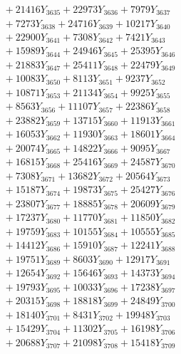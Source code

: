 \documentclass[a4paper,10pt]{article}
\begin{document}
{\begin{align}
&\;  + 21416 Y_{3635} + 22973 Y_{3636} + 7979 Y_{3637} \\[0.3ex]
&\;  + 7273 Y_{3638} + 24716 Y_{3639} + 10217 Y_{3640} \\[0.3ex]
&\;  + 22900 Y_{3641} + 7308 Y_{3642} + 7421 Y_{3643} \\[0.3ex]
&\;  + 15989 Y_{3644} + 24946 Y_{3645} + 25395 Y_{3646} \\[0.3ex]
&\;  + 21883 Y_{3647} + 25411 Y_{3648} + 22479 Y_{3649} \\[0.3ex]
&\;  + 10083 Y_{3650} + 8113 Y_{3651} + 9237 Y_{3652} \\[0.3ex]
&\;  + 10871 Y_{3653} + 21134 Y_{3654} + 9925 Y_{3655} \\[0.3ex]
&\;  + 8563 Y_{3656} + 11107 Y_{3657} + 22386 Y_{3658} \\[0.5ex]\allowbreak
&\;  + 23882 Y_{3659} + 13715 Y_{3660} + 11913 Y_{3661} \\[0.3ex]
&\;  + 16053 Y_{3662} + 11930 Y_{3663} + 18601 Y_{3664} \\[0.3ex]
&\;  + 20074 Y_{3665} + 14822 Y_{3666} + 9095 Y_{3667} \\[0.3ex]
&\;  + 16815 Y_{3668} + 25416 Y_{3669} + 24587 Y_{3670} \\[0.3ex]
&\;  + 7308 Y_{3671} + 13682 Y_{3672} + 20564 Y_{3673} \\[0.3ex]
&\;  + 15187 Y_{3674} + 19873 Y_{3675} + 25427 Y_{3676} \\[0.3ex]
&\;  + 23807 Y_{3677} + 18885 Y_{3678} + 20609 Y_{3679} \\[0.3ex]
&\;  + 17237 Y_{3680} + 11770 Y_{3681} + 11850 Y_{3682} \\[0.3ex]
&\;  + 19759 Y_{3683} + 10155 Y_{3684} + 10555 Y_{3685} \\[0.3ex]
&\;  + 14412 Y_{3686} + 15910 Y_{3687} + 12241 Y_{3688} \\[0.5ex]\allowbreak
&\;  + 19751 Y_{3689} + 8603 Y_{3690} + 12917 Y_{3691} \\[0.3ex]
&\;  + 12654 Y_{3692} + 15646 Y_{3693} + 14373 Y_{3694} \\[0.3ex]
&\;  + 19793 Y_{3695} + 10033 Y_{3696} + 17238 Y_{3697} \\[0.3ex]
&\;  + 20315 Y_{3698} + 18818 Y_{3699} + 24849 Y_{3700} \\[0.3ex]
&\;  + 18140 Y_{3701} + 8431 Y_{3702} + 19948 Y_{3703} \\[0.3ex]
&\;  + 15429 Y_{3704} + 11302 Y_{3705} + 16198 Y_{3706} \\[0.3ex]
&\;  + 20688 Y_{3707} + 21098 Y_{3708} + 15418 Y_{3709} \\[0.3ex]

\end{align}}
\end{document}
